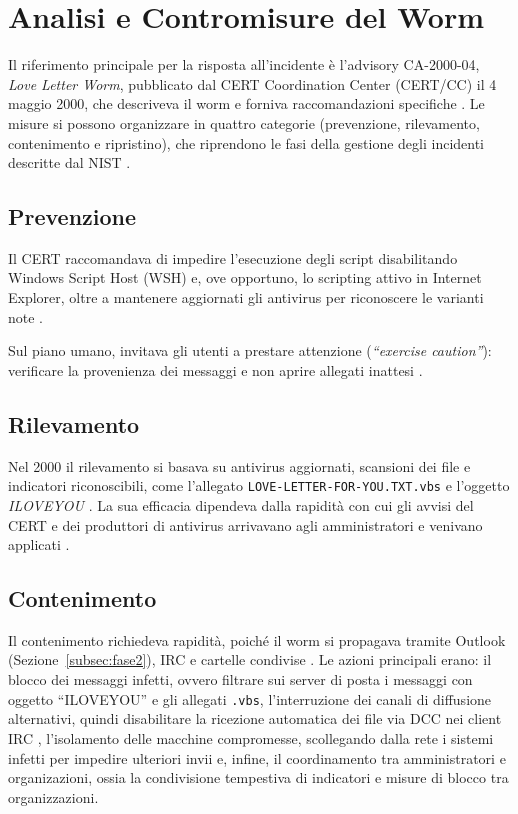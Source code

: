 \section{Analisi e Contromisure del Worm}\label{sec:Contromisure}
Il riferimento principale per la risposta all'incidente è l’advisory CA-2000-04, \emph{Love Letter Worm}, pubblicato dal CERT Coordination Center (CERT/CC) il 4 maggio 2000, che descriveva il worm e forniva raccomandazioni specifiche \cite{cert2000}. Le misure si possono organizzare in quattro categorie (prevenzione, rilevamento, contenimento e ripristino), che riprendono le fasi della gestione degli incidenti descritte dal NIST \cite{cichonski2012}.

\subsection{Prevenzione}
Il CERT raccomandava di impedire l’esecuzione degli script disabilitando Windows Script Host (WSH) e, ove opportuno, lo scripting attivo in Internet Explorer, oltre a mantenere aggiornati gli antivirus per riconoscere le varianti note \cite{cert2000}.

Sul piano umano, invitava gli utenti a prestare attenzione (\emph{``exercise caution''}): verificare la provenienza dei messaggi e non aprire allegati inattesi \cite{cert2000}.

\subsection{Rilevamento}
Nel 2000 il rilevamento si basava su antivirus aggiornati, scansioni dei file e indicatori riconoscibili, come l’allegato \texttt{LOVE-LETTER-FOR-YOU.TXT.vbs} e l'oggetto \emph{ILOVEYOU} \cite{cert2000, bishop2000}. La sua efficacia dipendeva dalla rapidità con cui gli avvisi del CERT e dei produttori di antivirus arrivavano agli amministratori e venivano applicati \cite{cert2000, gao2000iloveyou}.

\subsection{Contenimento}
Il contenimento richiedeva rapidità, poiché il worm si propagava tramite Outlook (Sezione~\ref{subsec:fase2}), IRC e cartelle condivise \cite{cert2000, bishop2000}. Le azioni principali erano: il blocco dei messaggi infetti, ovvero filtrare sui server di posta i messaggi con oggetto ``ILOVEYOU'' e gli allegati \texttt{.vbs}, l'interruzione dei canali di diffusione alternativi, quindi disabilitare la ricezione automatica dei file via DCC nei client IRC \cite{cert2000}, l'isolamento delle macchine compromesse, scollegando dalla rete i sistemi infetti per impedire ulteriori invii \cite{cichonski2012} e, infine, il coordinamento tra amministratori e organizazioni, ossia la condivisione tempestiva di indicatori e misure di blocco tra organizzazioni.

